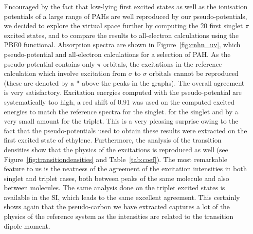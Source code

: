 \documentclass[12pt]{article}
\begin{document}
Encouraged by the fact that low-lying first excited states as well as the ionisation potentials of a large range of PAHs are 
well reproduced by our pseudo-potentials,
we decided to explore the virtual space further by computing the 20 first singlet
$\pi$ excited states, and to compare the results to all-electron calculations using the PBE0 functional.
Absorption spectra are shown in Figure~\ref{fig:cnhn_uv}, which pseudo-potential and all-electron
calculations for a selection of PAH.
As the pseudo-potential contains only $\pi$ orbitals, the excitations in the reference
calculation which involve excitation from $\sigma$ to $\sigma$ orbitals cannot be reproduced 
(these are denoted by a * above the peaks in the graphs).
The overall agreement is very satisfactory.
Excitation energies computed with the pseudo-potential are systematically too high, a red shift of
0.91 was used on the computed excited energies to match the reference spectra for the singlet.
for the singlet and by a very small amount for the triplet.
This is a very pleasing surprise owing to the fact that the pseudo-potentials used
to obtain these results were extracted on the first excited state of ethylene.
Furthermore, the analysis of the transition densities show that the physics of the excitations
is reproduced as well (see Figure~\ref{fig:transitiondensities} and Table~\ref{tab:coef}).
The most remarkable feature to us is the neatness of the agreement of the excitation intensities in both singlet and triplet cases, both between peaks of the same molecule and also between molecules.
The same analysis done on the triplet excited states is available in the SI, which leads to the same
excellent agreement.
This certainly shows again that the pseudo-carbon we have extracted captures a lot of the physics of the reference system as the intensities are related to the transition dipole moment.

 
\end{document}

